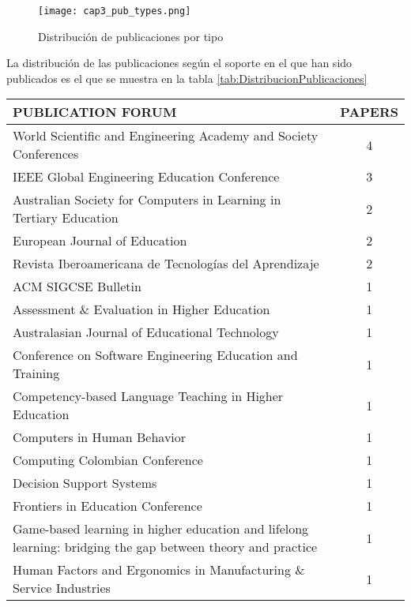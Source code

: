 \begin{figure}[H]
  \begin{center}
    \texttt{[image: cap3\_pub\_types.png]}
  \end{center}
  \caption{Distribución de publicaciones por tipo}
  \label{fig:PublicacionesTipos}
\end{figure}

La distribución de las publicaciones según el soporte en el que han sido publicados es el que se muestra en la tabla \ref{tab:DistribucionPublicaciones}

\begin{table}[H]
  \begin{center}
  \begin{tabular}{| m{12cm} | c |}
    \hline
    PUBLICATION FORUM & PAPERS\\
    \hline
    \hline 
    World Scientific and Engineering Academy and Society Conferences & 4\\
    \hline
    IEEE Global Engineering Education Conference & 3\\
    \hline
    Australian Society for Computers in Learning in Tertiary Education & 2\\
    \hline
    European Journal of Education & 2\\
    \hline
    Revista Iberoamericana de Tecnologías del Aprendizaje & 2\\
    \hline
    ACM SIGCSE Bulletin & 1\\
    \hline
    Assessment \& Evaluation in Higher Education & 1\\
    \hline
    Australasian Journal of Educational Technology & 1\\
    \hline
    Conference on Software Engineering Education and Training & 1\\
    \hline
    Competency-based Language Teaching in Higher Education & 1\\
    \hline
    Computers in Human Behavior & 1\\
    \hline
    Computing Colombian Conference & 1\\
    \hline
    Decision Support Systems & 1\\
    \hline
    Frontiers in Education Conference & 1\\
    \hline
    Game-based learning in higher education and lifelong learning: bridging the gap between theory and practice & 1\\
    \hline
    Human Factors and Ergonomics in Manufacturing \& Service Industries & 1\\

\end{tabular}
\end{center}
\end{table}
